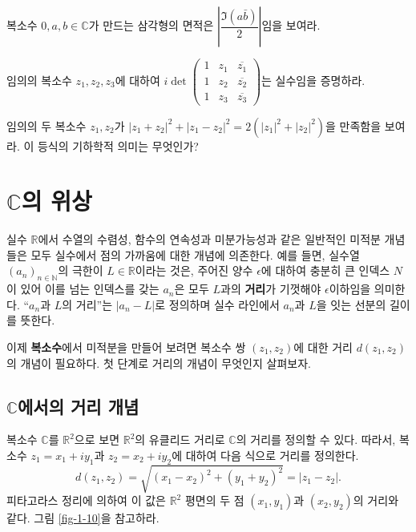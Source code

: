 \begin{salt_exercise} \label{ex-1-19}
복소수 $0, a, b \in\mathbb C$가 만드는 삼각형의 면적은
$\left| \dfrac{\Im(a\bar b)}2\right|$임을 보여라.
\end{salt_exercise}

\begin{salt_exercise} \label{ex-1-20}
임의의 복소수 $z_1,z_2, z_3$에 대하여
$i\det \begin{pmatrix}
1 & z_1 & \overline{z_1} \\
1 & z_2 & \overline{z_2} \\
1 & z_3 & \overline{z_3} 
\end{pmatrix}$는 실수임을 증명하라.
\end{salt_exercise}

\begin{salt_exercise} \label{ex-1-21}
임의의 두 복소수 $z_1, z_2$가
$|z_1+z_2|^2 + |z_1-z_2|^2 =2(|z_1|^2+|z_2|^2)$을 만족함을 보여라.
이 등식의 기하학적 의미는 무엇인가?
\end{salt_exercise}

\section{$\mathbb C$의 위상}

실수 $\mathbb R$에서 수열의 수렴성, 함수의 연속성과 미분가능성과 같은
일반적인 미적분 개념들은 모두 실수에서 점의 가까움에 대한 개념에 의존한다.
예를 들면, 실수열 $(a_n)_{n\in\mathbb N}$의 극한이 $L\in\mathbb R$이라는 것은,
주어진 양수 $\epsilon$에 대하여 충분히 큰 인덱스 $N$이 있어 이를 넘는 인덱스를 갖는
 $a_n$은 모두 $L$과의 {\bf 거리}가 기껏해야 $\epsilon$이하임을 의미한다.
``$a_n$과  $L$의 거리''는 $|a_n-L|$로 정의하며
실수 라인에서 $a_n$과 $L$을 잇는 선분의 길이를 뜻한다.

이제 {\bf 복소수}에서 미적분을 만들어 보려면
복소수 쌍 $(z_1, z_2)$에 대한 거리 $d(z_1, z_2)$의 개념이 필요하다.
첫 단계로 거리의 개념이 무엇인지 살펴보자.

\subsection{$\mathbb C$에서의 거리 개념}

복소수 $\mathbb C$를 $\mathbb R^2$으로 보면 $\mathbb R^2$의 유클리드 거리로
$\mathbb C$의 거리를 정의할 수 있다.
따라서, 복소수 $z_1=x_1+iy_1$과 $z_2=x_2+iy_2$에 대하여 
다음 식으로 거리를 정의한다.
$$
d(z_1,z_2) = \sqrt{(x_1-x_2)^2 + (y_1+y_2)^2} = |z_1-z_2|.
$$
피타고라스 정리에 의하여 이 값은 $\mathbb R^2$ 평면의 두 점 $(x_1, y_1)$과 $(x_2, y_2)$의 거리와 같다.
그림 \ref{fig-1-10}을 참고하라.


